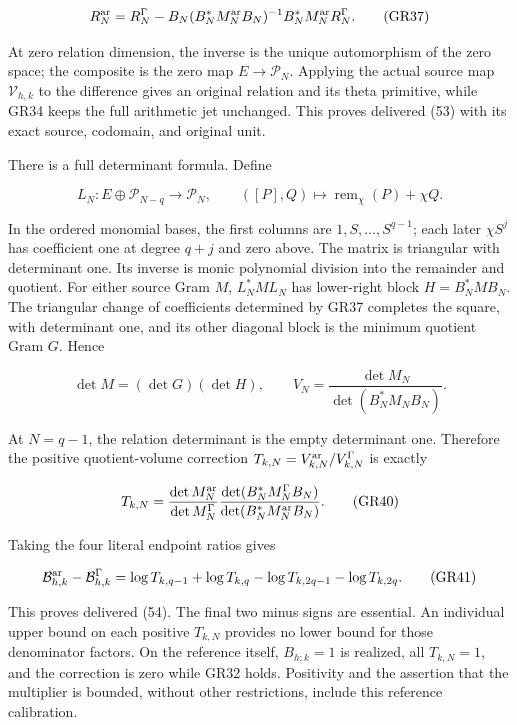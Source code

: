 \[
R_N^{\rm ar}
=R_N^\Gamma-
B_N(B_N^*M_N^{\rm ar}B_N)^{-1}B_N^*M_N^{\rm ar}R_N^\Gamma.
\tag{GR37}
\]

At zero relation dimension, the inverse is the unique automorphism of the zero space; the composite is the zero map \(E\to\mathcal P_N\). Applying the actual source map \(\mathcal V_{h,k}\) to the difference gives an original relation and its theta primitive, while GR34 keeps the full arithmetic jet unchanged. This proves delivered (53) with its exact source, codomain, and original unit.

There is a full determinant formula. Define

\[
L_N:E\oplus\mathcal P_{N-q}\longrightarrow\mathcal P_N,\qquad
([P],Q)\longmapsto\operatorname{rem}_\chi(P)+\chi Q.
\tag{GR38}
\]

In the ordered monomial bases, the first columns are \(1,S,\ldots,S^{q-1}\); each later \(\chi S^j\) has coefficient one at degree \(q+j\) and zero above. The matrix is triangular with determinant one. Its inverse is monic polynomial division into the remainder and quotient. For either source Gram \(M\), \(L_N^*ML_N\) has lower-right block \(H=B_N^*MB_N\). The triangular change of coefficients determined by GR37 completes the square, with determinant one, and its other diagonal block is the minimum quotient Gram \(G\). Hence

\[
\det M=(\det G)(\det H),\qquad
V_N=\frac{\det M_N}{\det(B_N^*M_NB_N)}.
\tag{GR39}
\]

At \(N=q-1\), the relation determinant is the empty determinant one. Therefore the positive quotient-volume correction \(T_{k,N}=V_{k,N}^{\rm ar}/V_{k,N}^\Gamma\) is exactly

\[
T_{k,N}=
\frac{\det M_N^{\rm ar}}{\det M_N^\Gamma}
\frac{\det(B_N^*M_N^\Gamma B_N)}
{\det(B_N^*M_N^{\rm ar}B_N)}.
\tag{GR40}
\]

Taking the four literal endpoint ratios gives

\[
\mathcal B_{h,k}^{\rm ar}-\mathcal B_{h,k}^\Gamma
=\log T_{k,q-1}+\log T_{k,q}
-\log T_{k,2q-1}-\log T_{k,2q}.
\tag{GR41}
\]

This proves delivered (54). The final two minus signs are essential. An individual upper bound on each positive \(T_{k,N}\) provides no lower bound for those denominator factors. On the reference itself, \(B_{h;k}=1\) is realized, all \(T_{k,N}=1\), and the correction is zero while GR32 holds. Positivity and the assertion that the multiplier is bounded, without other restrictions, include this reference calibration.

